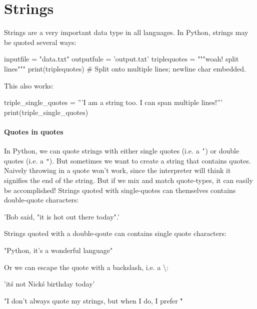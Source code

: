 \documentclass[12pt]{article} \newif\ifsolution\solutiontrue %
\begin{document}
\section{Strings}
Strings are a very important data type in all languages.  
In Python, strings may be quoted several ways:

\begin{python} inputfile = "data.txt"
outputfule = 'output.txt'
triplequotes = """woah!
  split lines"""
print(triplequotes)  # Split onto multiple lines; newline char embedded.
\end{python}


This also works:

\begin{python}
triple_single_quotes = '''I am a string too.
I can span multiple lines!'''
print(triple_single_quotes)
\end{python}

\paragraph{Quotes in quotes}
In Python, we can quote strings with either single quotes (i.e. a \texttt{'}) or double quotes (i.e. a \texttt{"}). But sometimes we want to create a string that contains quotes. Naively throwing in a quote won't work, since the interpreter will think it signifies the end of the string. But if we mix and match quote-types, it can easily be accomplished! Strings quoted with single-quotes can themselves contains double-quote characters:

\begin{python}
'Bob said, "it is hot out there today".'
\end{python}

Strings quoted with a double-qoute can contains single quote characters:

\begin{python}
"Python, it's a wonderful language"
\end{python}

Or we can escape the quote with a backslash, i.e. a \textbackslash:

\begin{python}
'it\'s not Nick\'s birthday today'
\end{python}

\begin{python}
"I don't always quote my strings, but when I do, I prefer \""
\end{python}
\end{document}
